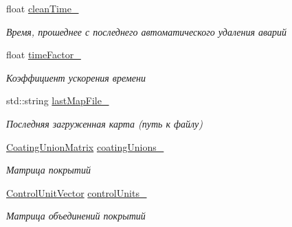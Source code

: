 \begin{DoxyCompactItemize}
float \hyperlink{classrtm_1_1_world_controller_adf27005742c62e45a779ef60db6c3ab9}{clean\+Time\+\_\+}
\begin{DoxyCompactList}\small\item\em Время, прошеднее с последнего автоматического удаления аварий \end{DoxyCompactList}\item 
\mbox{\label{classrtm_1_1_world_controller_aacdd7b79b8d34710d8149cc6f628a205}} 
float \hyperlink{classrtm_1_1_world_controller_aacdd7b79b8d34710d8149cc6f628a205}{time\+Factor\+\_\+}
\begin{DoxyCompactList}\small\item\em Коэффициент ускорения времени \end{DoxyCompactList}\item 
\mbox{\label{classrtm_1_1_world_controller_a9a654be15f165442066c89ad51d8d107}} 
std\+::string \hyperlink{classrtm_1_1_world_controller_a9a654be15f165442066c89ad51d8d107}{last\+Map\+File\+\_\+}
\begin{DoxyCompactList}\small\item\em Последняя загруженная карта (путь к файлу) \end{DoxyCompactList}\item 
\mbox{\label{classrtm_1_1_world_controller_abfdb2934c555cde911311bc7cb0e54af}} 
\hyperlink{namespacertm_adc6cbe68dc67c19da757de5768da04cc}{Coating\+Union\+Matrix} \hyperlink{classrtm_1_1_world_controller_abfdb2934c555cde911311bc7cb0e54af}{coating\+Unions\+\_\+}
\begin{DoxyCompactList}\small\item\em Матрица покрытий \end{DoxyCompactList}\item 
\mbox{\label{classrtm_1_1_world_controller_a3ff1e23bc217832142a171ca04794dd8}} 
\hyperlink{namespacertm_a4a3a9823e8a845d46e86793bb854caa1}{Control\+Unit\+Vector} \hyperlink{classrtm_1_1_world_controller_a3ff1e23bc217832142a171ca04794dd8}{control\+Units\+\_\+}
\begin{DoxyCompactList}\small\item\em Матрица объединений покрытий \end{DoxyCompactList}\item 

\end{DoxyCompactItemize}
